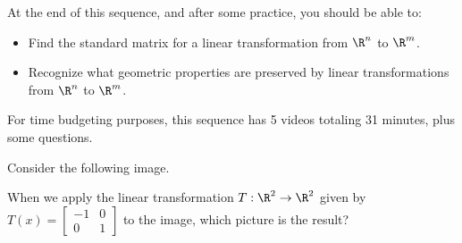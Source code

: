 




At the end of this sequence, and after some practice, you should be able to:

\begin{itemize}
\item Find the standard matrix for a linear transformation from $\R^n$ to $\R^m$.   
\item Recognize what geometric properties are preserved by linear transformations from 
$\R^n$ to $\R^m$.  
\end{itemize}

For time budgeting purposes, this sequence has 5 videos totaling 31 minutes, 
plus some questions.  



\endedxtext

\endedxvertical







Consider the following image.  

\begin{center}
 
\end{center}

When we apply the linear transformation $T: \R^2 \rightarrow \R^2$ given by $T(x) = \left[ \begin{array}{cc}
-1 & 0 \\ 0 & 1 \end{array} \right]$ to the image, which picture is the result?

\begin{center}
 
\\
 

\end{center}




